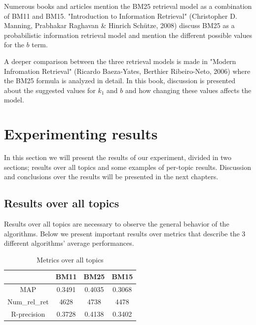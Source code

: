\documentclass[letterpaper,11pt]{article}
\begin{document}
Numerous books and articles mention the BM25 retrieval model as a combination of BM11 and BM15. "Introduction to Information Retrieval"  (Christopher D. Manning, Prabhakar Raghavan \& Hinrich Schütze, 2008) discuss BM25 as a probabilistic information retrieval model and mention the different possible values for the $b$ term. 

A deeper comparison between the three retrieval models is made in "Modern Infromation Retrieval" (Ricardo Baeza-Yates, Berthier Ribeiro-Neto, 2006) where the BM25 formula is analyzed in detail. In this book, discussion is presented about the suggested values for $k_1$ and $b$ and how changing these values affects the model. 



\section{Experimenting results}

In this section we will present the results of our experiment, divided in two sections; results over all topics and some examples of per-topic results. Discussion and conclusions over the results will be presented in the next chapters.

\subsection{Results over all topics}


Results over  all topics are necessary to observe the general behavior of the algorithms. Below we present important results over metrics that describe the 3 different algorithms' average performances.


\begin{center}
\begin{table}[ht]
\centering
\begin{tabular}{c | c c c}
   & BM11  & BM25 & BM15  \\  \hline
MAP & 0.3491 & 0.4035 & 0.3068 \\
Num\_rel\_ret & 4628 & 4738 & 4478 \\
R-precision & 0.3728 & 0.4138 & 0.3402
\end{tabular}
\caption{Metrics over all topics}  
\end{table}
\end{center}
\end{document}
